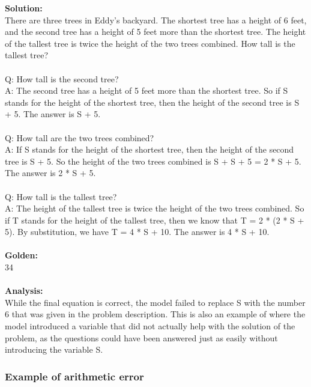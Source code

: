 \noindent
\textbf{Solution:} \\
There are three trees in Eddy's backyard. The shortest tree has a height of 6 feet, and the second tree has a height of 5 feet more than the shortest tree. The height of the tallest tree is twice the height of the two trees combined. How tall is the tallest tree? \\
 \\
Q: How tall is the second tree? \\
A: The second tree has a height of 5 feet more than the shortest tree. So if S stands for the height of the shortest tree, then the height of the second tree is S + 5. The answer is S + 5. \\
 \\
Q: How tall are the two trees combined? \\
A: If S stands for the height of the shortest tree, then the height of the second tree is S + 5. So the height of the two trees combined is S + S + 5 = 2 * S + 5. The answer is 2 * S + 5. \\
 \\
Q: How tall is the tallest tree? \\
A: The height of the tallest tree is twice the height of the two trees combined. So if T stands for the height of the tallest tree, then we know that T = 2 * (2 * S + 5). By substitution, we have T = 4 * S + 10. The answer is 4 * S + 10. \\
 \\
\textbf{Golden:} \\
34 \\
 \\
\textbf{Analysis:} \\
While the final equation is correct, the model failed to replace S with the number 6 that was given in the problem description. This is also an example of where the model introduced a variable that did not actually help with the solution of the problem, as the questions could have been answered just as easily without introducing the variable S.

\subsubsection{Example of arithmetic error}

